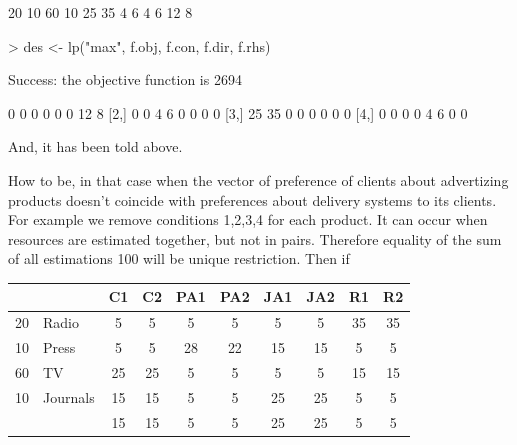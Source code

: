 \documentclass[a4paper,11pt]{scrartcl}
\begin{document}
\begin{Schunk}
\begin{Soutput}
 [1] 20 10 60 10 25 35  4  6  4  6 12  8
\end{Soutput}
\begin{Sinput}
> des <- lp("max", f.obj, f.con, f.dir, f.rhs)
\end{Sinput}
\begin{Soutput}
Success: the objective function is 2694 
\end{Soutput}
\begin{Soutput}
     [,1] [,2] [,3] [,4] [,5] [,6] [,7] [,8]
[1,]    0    0    0    0    0    0   12    8
[2,]    0    0    4    6    0    0    0    0
[3,]   25   35    0    0    0    0    0    0
[4,]    0    0    0    0    4    6    0    0
\end{Soutput}
\end{Schunk}
 And, it has been told above.
 
 How to be, in that case when the vector of preference of clients about advertizing products doesn't coincide with preferences about delivery systems to its clients.
 For example we remove conditions 1,2,3,4 for each product.
 It can occur when resources are estimated together, but not in pairs.
 Therefore equality of the sum of all estimations 100 will be unique restriction.
 Then if
 
 
 
 
 \begin{tabular}{|l|l |c| c| c| c| c| c| c| c|}
\hline
&      &  C1 & C2  &  PA1 & PA2 & JA1 & JA2 & R1 & R2\\
\hline
20&Radio &  5 & 5  &  5 & 5 & 5 & 5 & 35 & 35\\
\hline
10&Press &  5 & 5  &  28 & 22 &  15 & 15 & 5 & 5\\
\hline
60&TV &  25 & 25  &  5 & 5 & 5 & 5 & 15 & 15\\
\hline
10&Journals &  15 & 15  &  5 & 5 & 25 & 25 & 5 & 5\\
\hline
& &  15 & 15  &  5 & 5 & 25 & 25 & 5 & 5\\
\hline
\end{tabular}
\end{document}
